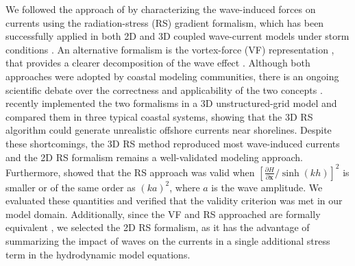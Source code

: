 \documentclass[preprint,12pt,authoryear]{elsarticle}
\begin{document}
We followed the approach of \cite{dietrich2012performance} by characterizing the wave-induced forces on currents using the radiation-stress (RS) gradient formalism, which has been successfully applied in both 2D and 3D coupled wave-current models under storm conditions \citep{hope2013hindcast, sebastian2014characterizing, brown2013depth}. An alternative formalism is the vortex-force (VF) representation \citep{mcwilliams2004asymptotic}, that provides a clearer decomposition of the wave effect \citep{lane2007wave}. Although both approaches were adopted by coastal modeling communities, there is an ongoing scientific debate over the correctness and applicability of the two concepts \citep{ardhuin2008comments, mellor2013waves, mellor2015combined, ardhuin2017comments}. \cite{xia2020implementation} recently implemented the two formalisms in a 3D unstructured-grid model and compared them in three typical coastal systems, showing that the 3D RS algorithm could generate unrealistic offshore currents near shorelines. Despite these shortcomings, the 3D RS method reproduced most wave-induced currents and the 2D RS formalism remains a well-validated modeling approach. Furthermore, \cite{mellor2013waves} showed that the RS approach was valid when $[\frac{\partial H}{\partial\mathbf{x}}/\sinh(kh)]^2$ is smaller or of the same order as $(ka)^2$, where $a$ is the wave amplitude. We evaluated these quantities and verified that the validity criterion was met in our model domain. Additionally, since the VF and RS approached are formally equivalent \citep{lane2007wave}, we selected the 2D RS formalism, as it has the advantage of summarizing the impact of waves on the currents in a single additional stress term in the hydrodynamic model equations.
\end{document}
